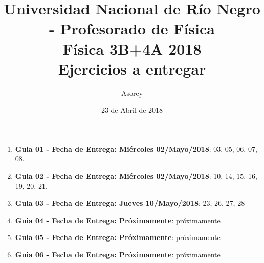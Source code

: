 \documentclass[a4paper,12pt]{article}
\begin{document}
\title{
{\normalsize{Universidad Nacional de Río Negro - Profesorado de Física}}\\
Física 3B+4A  2018 \\ Ejercicios a entregar}
\author{Asorey}
\date{23 de Abril de 2018}
\maketitle

\begin{enumerate}
	\item {\bf{Guia 01 - Fecha de Entrega: Miércoles 02/Mayo/2018}}: 03, 05, 06, 07, 08. 
	\item {\bf{Guia 02 - Fecha de Entrega: Miércoles 02/Mayo/2018}}: 10, 14, 15, 16, 19, 20, 21. 
		\item {\bf{Guia 03 - Fecha de Entrega: Jueves 10/Mayo/2018}}: 23, 26, 27, 28 
	\item {\bf{Guia 04 - Fecha de Entrega: Próximamente}}: próximamente
	\item {\bf{Guia 05 - Fecha de Entrega: Próximamente}}: próximamente
	\item {\bf{Guia 06 - Fecha de Entrega: Próximamente}}: próximamente
\end{enumerate}
\end{document}
